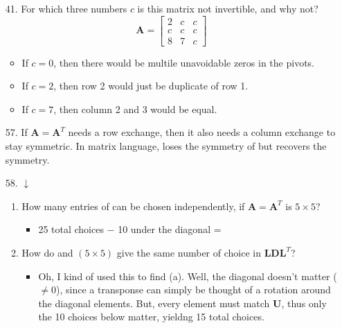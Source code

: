 \begin{itemize}
\begin{enumerate}
      \item[41.] For which three numbers \(c\) is this matrix not invertible, and why
        not?
        \[%
          \bm{A} =
          \begin{bmatrix}
            2 & c & c \\
            c & c & c \\
            8 & 7 & c
          \end{bmatrix}
        \]%
        \begin{itemize}\color{foreground}
          \item If \(c = 0\), then there would be multile unavoidable zeros in
            the pivots.
          \item If \( c = 2\), then row 2 would just be duplicate of row 1.
          \item If \( c = 7\), then column 2 and 3 would be equal.
        \end{itemize}

      \item[57.] If \(\bm{A} = \bm{A}^T\) needs a row exchange, then it also needs a
        column exchange to stay symmetric. In matrix language,  loses the
        symmetry of  but  recovers the symmetry.

      \item[58.] \( \downarrow \)
         \begin{enumerate}
           \item How many entries of  can be chosen independently, if \(
             \bm{A} = \bm{A}^T \) is \( 5 \times 5 \)?
             \begin{itemize}
               \item 25 total choices \(-\) 10 under the diagonal = 

             \end{itemize}

           \item How do  and  \( (5 \times 5) \) give the same
             number of choice in \( \bm{LDL}^T \)?
             \begin{itemize}\color{foreground}
               \item Oh, I kind of used this to find (a). Well,
                 the diagonal doesn't matter (\(\neq 0\)), since a transponse
                 can simply be thought of a rotation around the diagonal
                 elements. But, every element must match \(\bm{U}\), thus only
                 the 10 choices below matter, yieldng 15 total choices.
             \end{itemize}

        \end{enumerate}

    \end{enumerate}

\end{itemize}
